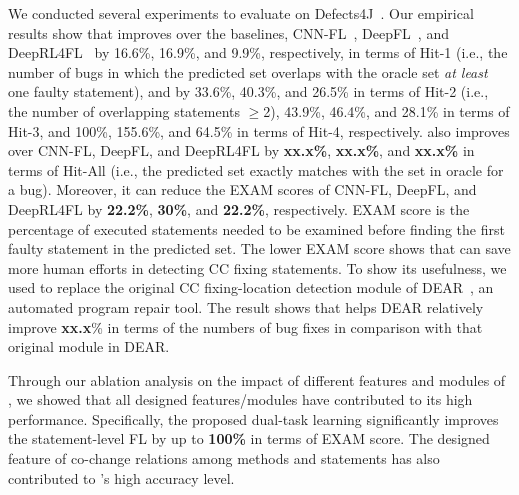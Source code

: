 We conducted several experiments to evaluate {\tool} on
Defects4J~\cite{defects4j}. Our empirical results show that {\tool}
improves over the baselines, CNN-FL~\cite{zhang2019cnn},
DeepFL~\cite{DeepFL}, and DeepRL4FL~\cite{icse21-fl} by 16.6\%,
16.9\%, and 9.9\%, respectively, in terms of Hit-1 (i.e., the number
of bugs in which the predicted set overlaps with the oracle set {\em
  at least} one faulty statement),
and by 33.6\%, 40.3\%, and 26.5\% in terms of Hit-2 (i.e., the number
of overlapping statements $\geq$2), 43.9\%, 46.4\%, and 28.1\% in terms
of Hit-3, and 100\%, 155.6\%, and 64.5\% in terms of Hit-4,
respectively.
%
{\tool} also improves over CNN-FL, DeepFL, and DeepRL4FL by {\bf
  xx.x\%}, {\bf xx.x\%}, and {\bf xx.x\%} in terms of Hit-All (i.e.,
the predicted set exactly matches with the set in oracle for a
bug). Moreover, it can reduce the EXAM scores of CNN-FL, DeepFL, and
DeepRL4FL by {\bf 22.2\%}, {\bf 30\%}, and {\bf 22.2\%},
respectively. EXAM score is the percentage of executed statements
needed to be examined before finding the first faulty statement in the
predicted set. The lower EXAM score shows that {\tool} can save more
human efforts in detecting CC fixing statements. To show its
usefulness, we used {\tool} to replace the original CC fixing-location
detection module of DEAR~\cite{icse22}, an automated program repair
tool. The result shows that {\tool} helps DEAR relatively improve {\bf
  xx.x}\% in terms of the numbers of bug fixes in comparison with that
original module in DEAR.


Through our ablation analysis on the impact of different features and
modules of {\tool}, we showed that all designed features/modules have
contributed to its high performance. Specifically, the proposed
dual-task learning significantly improves the statement-level FL by up
to {\bf 100\%} in terms of EXAM score. The designed feature of
co-change relations among methods and statements has also contributed
to {\tool}'s high accuracy level.




